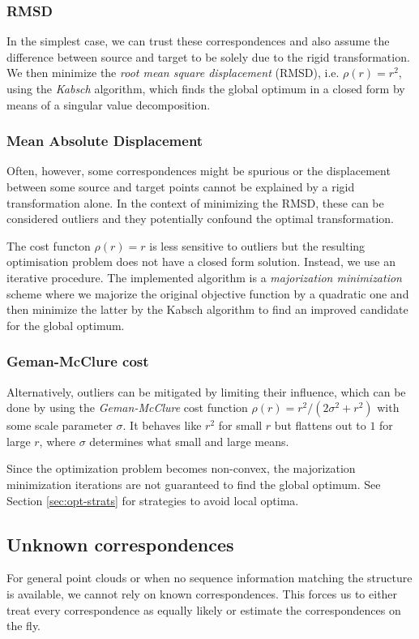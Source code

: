 \subsubsection{RMSD}
In the simplest case, we can trust these correspondences and also assume the
difference between source and target to be solely due to the rigid
transformation.
We then minimize the \emph{root mean square displacement} (RMSD), i.e.
$\rho(r) = r^2$, using the \emph{Kabsch} algorithm, which finds the global
optimum in a closed form by means of a singular value decomposition.

\subsubsection{Mean Absolute Displacement}
Often, however, some correspondences might be spurious or the displacement
between some source and target points cannot be explained by a rigid
transformation alone.
In the context of minimizing the RMSD, these can be considered outliers and they
potentially confound the optimal transformation.

The cost functon $\rho(r) = r$ is less sensitive to outliers but the resulting
optimisation problem does not have a closed form solution.
Instead, we use an iterative procedure.
The implemented algorithm is a \emph{majorization minimization} scheme where
we majorize the original objective function by a quadratic one and then
minimize the latter by the Kabsch algorithm to find an improved candidate for
the global optimum.

\subsubsection{Geman-McClure cost}
Alternatively, outliers can be mitigated by limiting their influence, which can
be done by using the \emph{Geman-McClure} cost function
$\rho(r) = r^2 / (2\sigma^2 + r^2)$ with some scale parameter $\sigma$.
It behaves like $r^2$ for small $r$ but flattens out to $1$
for large $r$, where $\sigma$ determines what small and large means.

Since the optimization problem becomes non-convex, the majorization minimization
iterations are not guaranteed to find the global optimum.
See Section \ref{sec:opt-strats} for strategies to avoid local optima.

\subsection{Unknown correspondences}
For general point clouds or when no sequence information matching the structure
is available, we cannot rely on known correspondences.
This forces us to either treat every correspondence as equally likely or
estimate the correspondences on the fly.

